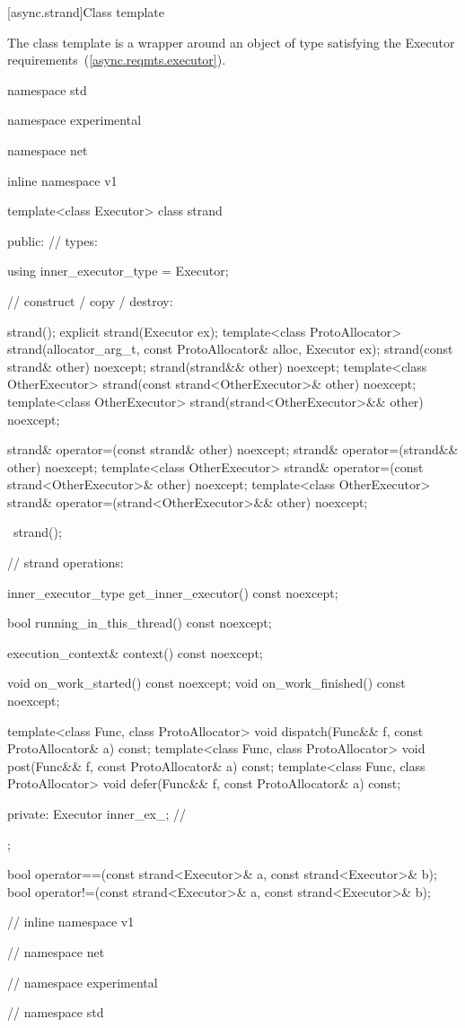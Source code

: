 [async.strand]{Class template }

%
\pnum
The class template  is a wrapper around an object of type  satisfying the Executor requirements~(\ref{async.reqmts.executor}).

\begin{codeblock}
namespace std {
namespace experimental {
namespace net {
inline namespace v1 {

  template<class Executor>
  class strand
  {
  public:
    // types:

    using inner_executor_type = Executor;

    // construct / copy / destroy:

    strand();
    explicit strand(Executor ex);
    template<class ProtoAllocator>
      strand(allocator_arg_t, const ProtoAllocator& alloc, Executor ex);
    strand(const strand& other) noexcept;
    strand(strand&& other) noexcept;
    template<class OtherExecutor> strand(const strand<OtherExecutor>& other) noexcept;
    template<class OtherExecutor> strand(strand<OtherExecutor>&& other) noexcept;

    strand& operator=(const strand& other) noexcept;
    strand& operator=(strand&& other) noexcept;
    template<class OtherExecutor> strand& operator=(const strand<OtherExecutor>& other) noexcept;
    template<class OtherExecutor> strand& operator=(strand<OtherExecutor>&& other) noexcept;

    ~strand();

    // strand operations:

    inner_executor_type get_inner_executor() const noexcept;

    bool running_in_this_thread() const noexcept;

    execution_context& context() const noexcept;

    void on_work_started() const noexcept;
    void on_work_finished() const noexcept;

    template<class Func, class ProtoAllocator>
      void dispatch(Func&& f, const ProtoAllocator& a) const;
    template<class Func, class ProtoAllocator>
      void post(Func&& f, const ProtoAllocator& a) const;
    template<class Func, class ProtoAllocator>
      void defer(Func&& f, const ProtoAllocator& a) const;

  private:
    Executor inner_ex_; // \expos
  };

  bool operator==(const strand<Executor>& a, const strand<Executor>& b);
  bool operator!=(const strand<Executor>& a, const strand<Executor>& b);

} // inline namespace v1
} // namespace net
} // namespace experimental
} // namespace std
\end{codeblock}

